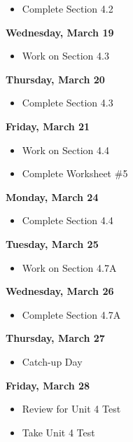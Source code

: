 \documentclass[11pt]{article}
\begin{document}
\begin{itemize}
\item Complete Section 4.2
\end{itemize}

\textbf{Wednesday, March 19}

\begin{itemize}
\item Work on Section 4.3
\end{itemize}

\textbf{Thursday, March 20}

\begin{itemize}
\item Complete Section 4.3
\end{itemize}

\textbf{Friday, March 21}

\begin{itemize}
\item Work on Section 4.4
\item Complete Worksheet \#5
\end{itemize}

\textbf{Monday, March 24}

\begin{itemize}
\item Complete Section 4.4
\end{itemize}

\textbf{Tuesday, March 25}

\begin{itemize}
\item Work on Section 4.7A
\end{itemize}

\textbf{Wednesday, March 26}

\begin{itemize}
\item Complete Section 4.7A
\end{itemize}

\textbf{Thursday, March 27}

\begin{itemize}
\item Catch-up Day
\end{itemize}

\textbf{Friday, March 28}

\begin{itemize}
\item Review for Unit 4 Test
\item Take Unit 4 Test
\end{itemize}
\end{document}
